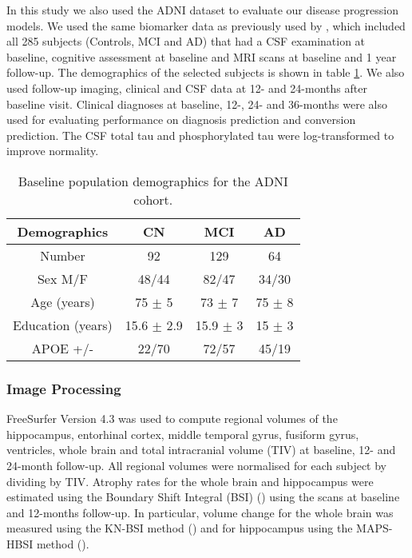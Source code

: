 In this study we also used the ADNI dataset to evaluate our disease progression models. We used the same biomarker data as previously used by \cite{young2014data}, which included all 285 subjects (Controls, MCI and AD) that had a CSF examination at baseline, cognitive assessment at baseline and MRI scans at baseline and 1 year follow-up. The demographics of the selected subjects is shown in table \ref{tab:adniDemographics}. We also used follow-up imaging, clinical and CSF data at 12- and 24-months after baseline visit. Clinical diagnoses at baseline, 12-, 24- and 36-months were also used for evaluating performance on diagnosis prediction and conversion prediction. The CSF total tau and phosphorylated tau were log-transformed to improve normality. 

\begin{table}[ht]
\centering
 \begin{tabular}{c | c c c}
  Demographics & CN & MCI & AD\\
  \hline
  Number & 92 & 129 & 64\\
  Sex M/F & 48/44 & 82/47 & 34/30\\
  Age (years) & 75 $\pm$ 5 & 73 $\pm$ 7 & 75 $\pm$ 8\\
  Education (years) & 15.6 $\pm$ 2.9 & 15.9 $\pm$ 3 & 15 $\pm$ 3\\
  APOE +/- & 22/70 & 72/57 & 45/19\\
 \end{tabular}
 \caption[Baseline population demographics for the ADNI cohort.]{Baseline population demographics for the ADNI cohort.}
 \label{tab:adniDemographics}
\end{table}

\subsubsection{Image Processing}

FreeSurfer Version 4.3 was used to compute regional volumes of the hippocampus, entorhinal cortex, middle temporal gyrus, fusiform gyrus, ventricles, whole brain and total intracranial volume (TIV) at baseline, 12- and 24-month follow-up. All regional volumes were normalised for each subject by dividing by TIV. Atrophy rates for the whole brain and hippocampus were estimated using the Boundary Shift Integral (BSI) (\cite{freeborough1997boundary}) using the scans at baseline and 12-months follow-up. In particular, volume change for the whole brain was measured using the KN-BSI method (\cite{leung2010robust}) and for hippocampus using the MAPS-HBSI method (\cite{leung2010automated}). 

